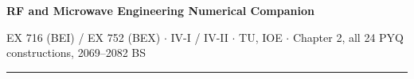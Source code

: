 \documentclass[10pt]{article}
\begin{document}
{\LARGE\bfseries RF and Microwave Engineering \gap\textcolor{sub}{Numerical Companion}}\par
{\footnotesize\color{sub} EX 716 (BEI) / EX 752 (BEX) $\cdot$ IV-I / IV-II $\cdot$ TU, IOE
$\cdot$ Chapter 2, all 24 PYQ constructions, 2069--2082 BS}
\vspace{3pt}\hrule\vspace{4pt}

\setcounter{section}{1}



\end{document}
